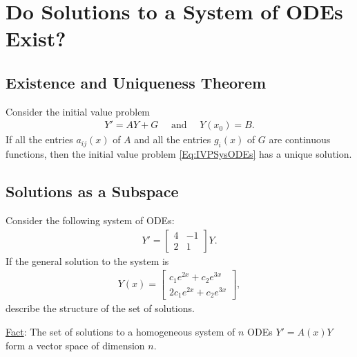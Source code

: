 \documentclass[12pt,a4paper]{article}
\newcounter{example}[section]
\begin{document}
\vfill

\newpage
	
\section{Do Solutions to a System of ODEs Exist?}

	\subsection{Existence and Uniqueness Theorem}
	Consider the initial value problem
		\begin{align}
		Y' = AY + G \quad \text{ and } \quad Y(x_0) = B . \tag{$\star$} \label{Eq:IVPSysODEs}
		\end{align}
	If all the entries $a_{ij} (x)$ of $A$ and all the entries $g_i (x)$ of $G$ are continuous functions, then the initial value problem \eqref{Eq:IVPSysODEs} has a unique solution.
	
	\subsection{Solutions as a Subspace}
	\begin{example}
	Consider the following system of ODEs:
		\begin{align*}
		Y' = \begin{bmatrix}
	4 & -1 \\ 2 & 1
	\end{bmatrix} Y .
		\end{align*}
	If the general solution to the system is
		\begin{align*}
		Y (x) = \begin{bmatrix}
		c_1 e^{2x} + c_2 e^{3x} \\ 2c_1 e^{2x} + c_2 e^{3x}
		\end{bmatrix},
		\end{align*}
	describe the structure of the set of solutions.
	\end{example}
	
	\vfill
	
	\underline{Fact}: The set of solutions to a homogeneous system of $n$ ODEs $Y' = A(x) Y$ form a vector space of dimension $n$.
	
	\newpage
	
\end{document}
